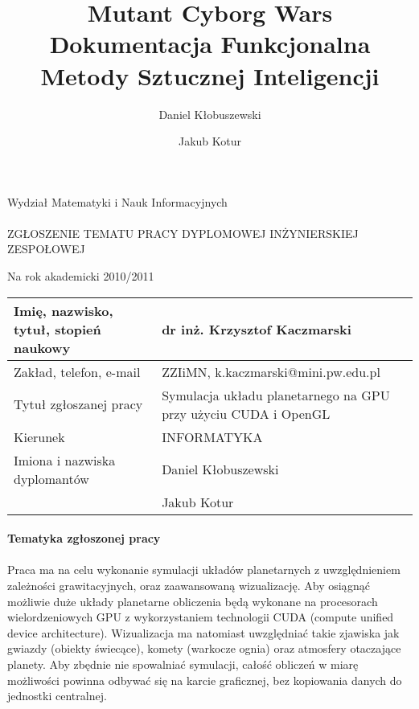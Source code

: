 \documentclass[a4paper,titlepage,10pt]{article}
\title{\huge Mutant Cyborg Wars \\\large Dokumentacja Funkcjonalna\\\small Metody Sztucznej Inteligencji }
\author{Daniel Kłobuszewski\and Jakub Kotur}
\begin{document}
	\paragraph{}

	Wydział Matematyki i Nauk Informacyjnych

	\paragraph{}
	\begin{center}
	ZGŁOSZENIE TEMATU PRACY DYPLOMOWEJ INŻYNIERSKIEJ ZESPOŁOWEJ

	Na rok akademicki 2010/2011
	\end{center}

	\begin{tabular}{ | l | p{} | }
	\hline
	Imię, nazwisko, tytuł, stopień naukowy & dr inż. Krzysztof Kaczmarski \\ \hline
	Zakład, telefon, e-mail & ZZIiMN, k.kaczmarski@mini.pw.edu.pl \\\hline
	Tytuł zgłoszanej pracy & Symulacja układu planetarnego na GPU przy użyciu CUDA i OpenGL \\\hline
	Kierunek & INFORMATYKA \\\hline
	Imiona i nazwiska dyplomantów & Daniel Kłobuszewski\\
	& Jakub Kotur \\\hline
	\end{tabular}

	\paragraph{Tematyka zgłoszonej pracy}

	\paragraph{}
	
	Praca ma na celu wykonanie symulacji układów planetarnych z uwzględnieniem zależności grawitacyjnych, oraz zaawansowaną wizualizację. Aby osiągnąć możliwie duże układy planetarne obliczenia będą wykonane na procesorach wielordzeniowych GPU z wykorzystaniem technologii CUDA (compute unified device architecture). Wizualizacja ma natomiast uwzględniać takie zjawiska jak gwiazdy (obiekty świecące), komety (warkocze ognia) oraz atmosfery otaczające planety. Aby zbędnie nie spowalniać symulacji, całość obliczeń w miarę możliwości powinna odbywać się na karcie graficznej, bez kopiowania danych do jednostki centralnej.
\end{document}
